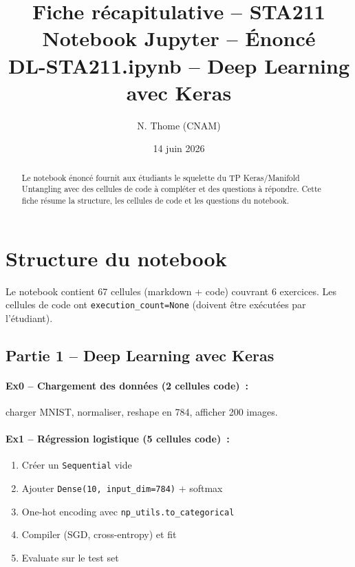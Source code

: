 \documentclass[a4paper,11pt]{article}
\title{\textbf{Fiche r\'ecapitulative -- STA211}\\[4pt]
\large Notebook Jupyter -- \'Enonc\'e \\[2pt]
\small DL-STA211.ipynb -- Deep Learning avec Keras}
\author{N. Thome (CNAM)}
\date{14 juin 2026}
\begin{document}
\maketitle
\thispagestyle{empty}

\begin{abstract}
Le notebook \'enonc\'e fournit aux \'etudiants le squelette du TP
Keras/Manifold Untangling avec des cellules de code \`a compl\'eter
et des questions \`a r\'epondre. Cette fiche r\'esume la structure,
les cellules de code et les questions du notebook.
\end{abstract}

\vfill
\tableofcontents
\newpage

\section{Structure du notebook}

Le notebook contient 67 cellules (markdown + code) couvrant 6
exercices. Les cellules de code ont \texttt{execution\_count=None}
(doivent \^etre ex\'ecut\'ees par l'\'etudiant).

\subsection{Partie 1 -- Deep Learning avec Keras}

\paragraph{Ex0 -- Chargement des donn\'ees (2 cellules code)~:}
charger MNIST, normaliser, reshape en 784, afficher 200 images.

\paragraph{Ex1 -- R\'egression logistique (5 cellules code)~:}
\begin{enumerate}
  \item Cr\'eer un \texttt{Sequential} vide
  \item Ajouter \texttt{Dense(10, input\_dim=784)} + softmax
  \item One-hot encoding avec \texttt{np\_utils.to\_categorical}
  \item Compiler (SGD, cross-entropy) et fit
  \item Evaluate sur le test set
\end{enumerate}
\end{document}
